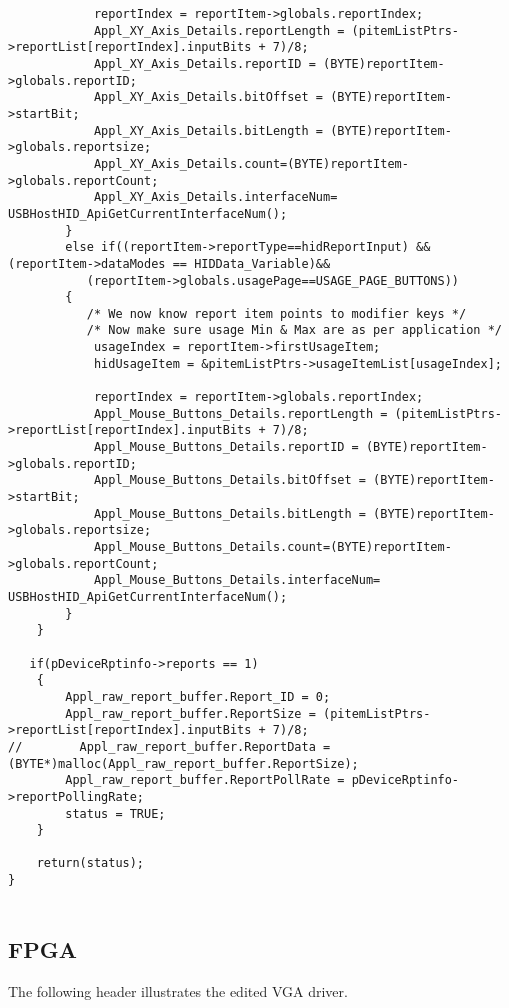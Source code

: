 \documentclass{article}
\begin{document}
\begin{verbatim}
            reportIndex = reportItem->globals.reportIndex;
            Appl_XY_Axis_Details.reportLength = (pitemListPtrs->reportList[reportIndex].inputBits + 7)/8;
            Appl_XY_Axis_Details.reportID = (BYTE)reportItem->globals.reportID;
            Appl_XY_Axis_Details.bitOffset = (BYTE)reportItem->startBit;
            Appl_XY_Axis_Details.bitLength = (BYTE)reportItem->globals.reportsize;
            Appl_XY_Axis_Details.count=(BYTE)reportItem->globals.reportCount;
            Appl_XY_Axis_Details.interfaceNum= USBHostHID_ApiGetCurrentInterfaceNum();
        }
        else if((reportItem->reportType==hidReportInput) && (reportItem->dataModes == HIDData_Variable)&&
           (reportItem->globals.usagePage==USAGE_PAGE_BUTTONS))
        {
           /* We now know report item points to modifier keys */
           /* Now make sure usage Min & Max are as per application */
            usageIndex = reportItem->firstUsageItem;
            hidUsageItem = &pitemListPtrs->usageItemList[usageIndex];

            reportIndex = reportItem->globals.reportIndex;
            Appl_Mouse_Buttons_Details.reportLength = (pitemListPtrs->reportList[reportIndex].inputBits + 7)/8;
            Appl_Mouse_Buttons_Details.reportID = (BYTE)reportItem->globals.reportID;
            Appl_Mouse_Buttons_Details.bitOffset = (BYTE)reportItem->startBit;
            Appl_Mouse_Buttons_Details.bitLength = (BYTE)reportItem->globals.reportsize;
            Appl_Mouse_Buttons_Details.count=(BYTE)reportItem->globals.reportCount;
            Appl_Mouse_Buttons_Details.interfaceNum= USBHostHID_ApiGetCurrentInterfaceNum();
        }
    }

   if(pDeviceRptinfo->reports == 1)
    {
        Appl_raw_report_buffer.Report_ID = 0;
        Appl_raw_report_buffer.ReportSize = (pitemListPtrs->reportList[reportIndex].inputBits + 7)/8;
//        Appl_raw_report_buffer.ReportData = (BYTE*)malloc(Appl_raw_report_buffer.ReportSize);
        Appl_raw_report_buffer.ReportPollRate = pDeviceRptinfo->reportPollingRate;
        status = TRUE;
    }

    return(status);
}


\end{verbatim}

\subsection{FPGA}

The following header illustrates the edited VGA driver.
\end{document}

